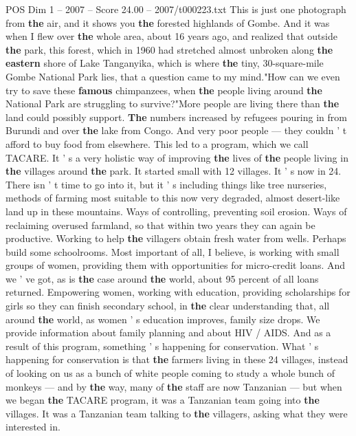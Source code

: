 \begin{textsample}{POS Dim 1 – 2007 – Score 24.00 – 2007/t000223.txt}
This is just one photograph from \textbf{the} air, and it shows you \textbf{the} forested highlands of Gombe.
And it was when I flew over \textbf{the} whole area, about 16 years ago, and realized that outside \textbf{the} park, this forest, which in 1960 had stretched almost unbroken along \textbf{the} \textbf{eastern} shore of Lake Tanganyika, which is where \textbf{the} tiny, 30-square-mile Gombe National Park lies, that a question came to my mind."How can we even try to save these \textbf{famous} chimpanzees, when \textbf{the} people living around \textbf{the} National Park are struggling to survive?"More people are living there than \textbf{the} land could possibly support. \textbf{The} numbers increased by refugees pouring in from Burundi and over \textbf{the} lake from Congo.
And very poor people — they couldn ' t afford to buy food from elsewhere.
This led to a program, which we call TACARE.
It ' s a very holistic way of improving \textbf{the} lives of \textbf{the} people living in \textbf{the} villages around \textbf{the} park.
It started small with 12 villages.
It ' s now in 24.
There isn ' t time to go into it, but it ' s including things like tree nurseries, methods of farming most suitable to this now very degraded, almost desert-like land up in these mountains.
Ways of controlling, preventing soil erosion.
Ways of reclaiming overused farmland, so that within two years they can again be productive.
Working to help \textbf{the} villagers obtain fresh water from wells.
Perhaps build some schoolrooms.
Most important of all, I believe, is working with small groups of women, providing them with opportunities for micro-credit loans.
And we ' ve got, as is \textbf{the} case around \textbf{the} world, about 95 percent of all loans returned.
Empowering women, working with education, providing scholarships for girls so they can finish secondary school, in \textbf{the} clear understanding that, all around \textbf{the} world, as women ' s education improves, family size drops.
We provide information about family planning and about HIV / AIDS.
And as a result of this program, something ' s happening for conservation.
What ' s happening for conservation is that \textbf{the} farmers living in these 24 villages, instead of looking on us as a bunch of white people coming to study a whole bunch of monkeys — and by \textbf{the} way, many of \textbf{the} staff are now Tanzanian — but when we began \textbf{the} TACARE program, it was a Tanzanian team going into \textbf{the} villages.
It was a Tanzanian team talking to \textbf{the} villagers, asking what they were interested in.

\end{textsample}
